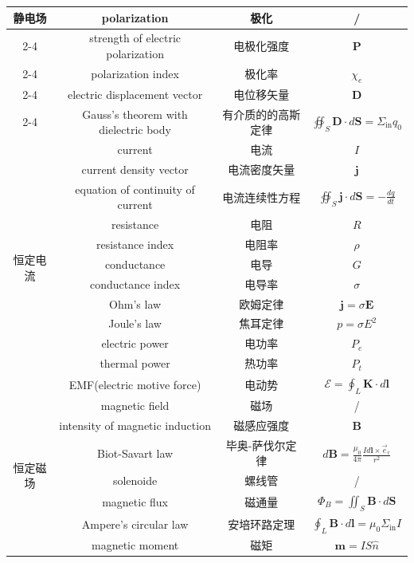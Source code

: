\documentclass{article}
\begin{document}
\begin{longtable}{|c|c|c|c|}
    \multirow{5}{*}{静电场}
    & polarization & 极化 & / \\
    \cline{2-4}
    & strength of electric polarization & 电极化强度 & $\boldsymbol{P}$ \\
    \cline{2-4}
    & polarization index & 极化率 & $\chi_e$ \\
    \cline{2-4}
    & electric displacement vector & 电位移矢量 & $\boldsymbol{D}$ \\
    \cline{2-4}
    & Gauss's theorem with dielectric body & 有介质的的高斯定律 & $\oiint_{S}\boldsymbol{D}\cdot d\boldsymbol{S}=\Sigma_{\text{in}}q_0$ \\
    \hline
    \multirow{12}{*}{恒定电流}
    & current & 电流 & $I$ \\
    \cline{2-4}
    & current density vector & 电流密度矢量 & $\boldsymbol{j}$ \\
    \cline{2-4}
    & equation of continuity of current & 电流连续性方程 & $\oiint_{S}\boldsymbol{j}\cdot d\boldsymbol{S}=-\frac{dq}{dt}$ \\
    \cline{2-4}
    & resistance & 电阻 & $R$ \\
    \cline{2-4}
    & resistance index & 电阻率 & $\rho$ \\
    \cline{2-4}
    & conductance & 电导 & $G$ \\
    \cline{2-4}
    & conductance index & 电导率 & $\sigma$ \\
    \cline{2-4}
    & Ohm's law & 欧姆定律 & $\boldsymbol{j}=\sigma \boldsymbol{E}$ \\
    \cline{2-4}
    & Joule's law & 焦耳定律 & $p=\sigma E^2$ \\
    \cline{2-4}
    & electric power & 电功率 & $P_e$ \\
    \cline{2-4}
    & thermal power & 热功率 & $P_t$ \\
    \cline{2-4}
    & EMF(electric motive force) & 电动势 & $\mathcal{E}=\oint_{L}\boldsymbol{K}\cdot d\boldsymbol{l}$ \\
    \hline

    \multirow{7}{*}{恒定磁场}
    & magnetic field & 磁场 & / \\
    \cline{2-4}
    & intensity of magnetic induction & 磁感应强度 & $\boldsymbol{B}$ \\
    \cline{2-4}
    & Biot-Savart law & 毕奥-萨伐尔定律 & $d\boldsymbol{B}=\frac{\mu_0}{4\pi}\frac{Id\boldsymbol{l}\times \vec{e}_{r}}{r^2}$ \\
    \cline{2-4}
    & solenoide & 螺线管 & / \\
    \cline{2-4}
    & magnetic flux & 磁通量 & $\Phi_{B}=\iint_{S}\boldsymbol{B}\cdot d\boldsymbol{S}$ \\
    \cline{2-4}
    & Ampere's circular law & 安培环路定理 & $\oint_{L}\boldsymbol{B}\cdot d\boldsymbol{l}=\mu_0 \Sigma_{\text{in}}I$ \\
    \cline{2-4}
    & magnetic moment & 磁矩 & $\boldsymbol{m}=IS\hat{n}$ \\  
    \hline


\end{longtable}
\end{document}
